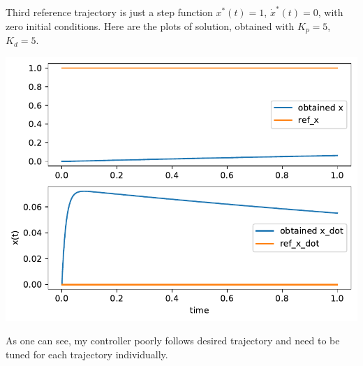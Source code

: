 \documentclass[a4paper,12pt]{article}
\begin{document}
            Third reference trajectory is just a step function $x^*(t)=1$, $\dot{x}^*(t) = 0$,
            with zero initial conditions. Here are the plots of solution, obtained with 
            $K_p = 5$, $K_d = 5$.
            \begin{center}
                \includegraphics[width = 0.8\linewidth]{2a_tr3.pdf}
            \end{center}
            As one can see, my controller poorly follows desired trajectory and need
            to be tuned for each trajectory individually. 
\end{document}
